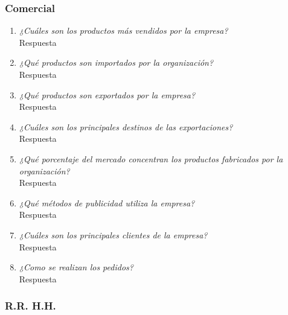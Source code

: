 \documentclass[a4paper,10pt]{article}
\begin{document}
		\subsubsection{Comercial}
		
		
			\begin{enumerate}[resume]
			
				\item \textit{¿Cuáles son los productos más vendidos por la empresa?}\\
			
				Respuesta
				
				\item \textit{¿Qué productos son importados por la organización?}\\
				
				Respuesta
				
				\item \textit{¿Qué productos son exportados por la empresa?}\\
				
				Respuesta
				
				\item \textit{¿Cuáles son los principales destinos de las exportaciones?}\\
				
				Respuesta
				
				\item \textit{¿Qué porcentaje del mercado concentran los productos fabricados por la organización?}\\
				
				Respuesta
				
				\item \textit{¿Qué métodos de publicidad utiliza la empresa?}\\
				
				Respuesta
				
				\item \textit{¿Cuáles son los principales clientes de la empresa?}\\
				
				Respuesta
				
				\item \textit{¿Como se realizan los pedidos?}\\
				
				Respuesta
				
			\end{enumerate}
		\subsubsection{R.R. H.H.}
		
\end{document}
